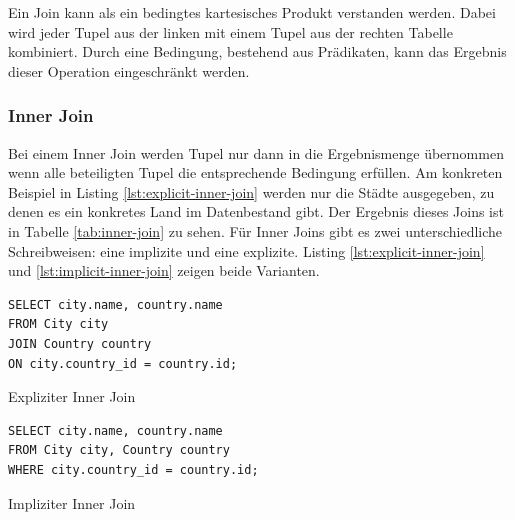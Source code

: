 \documentclass[a4paper]{article}
\begin{document}
Ein Join kann als ein bedingtes kartesisches Produkt verstanden werden. Dabei wird jeder Tupel aus der linken mit einem Tupel aus der rechten Tabelle kombiniert.  Durch eine Bedingung, bestehend aus Prädikaten, kann das Ergebnis dieser Operation eingeschränkt werden.

\subsubsection{Inner Join}
Bei einem Inner Join werden Tupel nur dann in die Ergebnismenge übernommen wenn alle beteiligten Tupel die entsprechende Bedingung erfüllen. Am konkreten Beispiel in Listing \ref{lst:explicit-inner-join} werden nur die Städte ausgegeben, zu denen es ein konkretes Land im Datenbestand gibt. Der Ergebnis dieses Joins ist in Tabelle \ref{tab:inner-join} zu sehen. Für Inner Joins gibt es zwei unterschiedliche Schreibweisen: eine implizite und eine explizite. Listing \ref{lst:explicit-inner-join} und \ref{lst:implicit-inner-join} zeigen beide Varianten.

\begin{listing}[H]
\begin{verbatim}
SELECT city.name, country.name 
FROM City city 
JOIN Country country 
ON city.country_id = country.id;
\end{verbatim}
\caption{Expliziter Inner Join}
\label{lst:explicit-inner-join}
\end{listing}

\begin{listing}[H]
\begin{verbatim}
SELECT city.name, country.name 
FROM City city, Country country 
WHERE city.country_id = country.id;
\end{verbatim}
\caption{Impliziter Inner Join}
\label{lst:inplicit-inner-join}
\end{listing}
\end{document}
